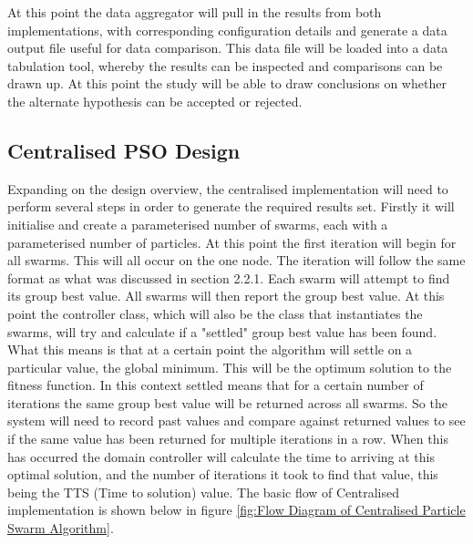 \documentclass[oneside,12pt]{book}
\begin{document}
At this point the data aggregator will pull in the results from both implementations, with corresponding configuration details and generate a data output file useful for data comparison. This data file will be loaded into a data tabulation tool, whereby the results can be inspected and comparisons can be drawn up. At this point the study will be able to draw conclusions on whether the alternate hypothesis can be accepted or rejected.  

\subsection{Centralised PSO Design}
Expanding on the design overview, the centralised implementation will need to perform several steps in order to generate the required results set. Firstly it will initialise and create a parameterised number of swarms, each with a parameterised number of particles. At this point the first iteration will begin for all swarms. This will all occur on the one node. The iteration will follow the same format as what was discussed in section 2.2.1. Each swarm will attempt to find its group best value. All swarms will then report the group best value. At this point the controller class, which will also be the class that instantiates the swarms, will try and calculate if a "settled" group best value has been found. What this means is that at a certain point the algorithm will settle on a particular value, the global minimum. This will be the optimum solution to the fitness function. In this context settled means that for a certain number of iterations the same group best value will be returned across all swarms. So the system will need to record past values and compare against returned values to see if the same value has been returned for multiple iterations in a row. When this has occurred the domain controller will calculate the time to arriving at this optimal solution, and the number of iterations it took to find that value, this being the TTS (Time to solution) value. 
The basic flow of Centralised implementation is shown below in figure \ref{fig:Flow Diagram of Centralised Particle Swarm Algorithm}. 
\end{document}
